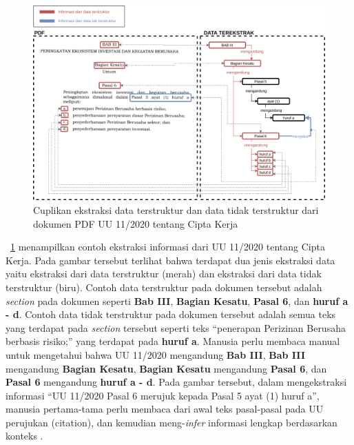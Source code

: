 \begin{figure}[H]
  \centering
  \includegraphics[width=\textwidth]{pictures/terstruktur.png}
  \caption{Cuplikan ekstraksi data terstruktur dan data tidak terstruktur dari dokumen PDF UU 11/2020 tentang Cipta Kerja}
  \label{fig:ekstraksi-dokumen}
\end{figure}

\pic~\ref{fig:ekstraksi-dokumen} menampilkan contoh ekstraksi informasi dari UU 11/2020 tentang
Cipta Kerja. Pada gambar tersebut terlihat bahwa terdapat dua jenis ekstraksi data yaitu ekstraksi
dari data terstruktur (merah) dan ekstraksi dari data tidak terstruktur (biru). Contoh data
terstruktur pada dokumen tersebut adalah \textit{section} pada dokumen seperti \textbf{Bab III},
\textbf{Bagian Kesatu}, \textbf{Pasal 6}, dan \textbf{huruf a - d}. Contoh data tidak terstruktur
pada dokumen tersebut adalah semua teks yang terdapat pada \textit{section} tersebut seperti teks
``penerapan Perizinan Berusaha berbasis risiko;'' yang terdapat pada \textbf{huruf a}. Manusia perlu
membaca manual untuk mengetahui bahwa UU 11/2020 mengandung \textbf{Bab III}, \textbf{Bab III}
mengandung \textbf{Bagian Kesatu}, \textbf{Bagian Kesatu} mengandung \textbf{Pasal 6}, dan
\textbf{Pasal 6} mengandung \textbf{huruf a - d}. Pada gambar tersebut, dalam mengekstraksi
informasi ``UU 11/2020 Pasal 6 merujuk kepada Pasal 5 ayat (1) huruf a'', manusia pertama-tama perlu
membaca dari awal teks pasal-pasal pada UU perujukan (citation), dan kemudian meng-\textit{infer}
informasi lengkap berdasarkan konteks \legal.

